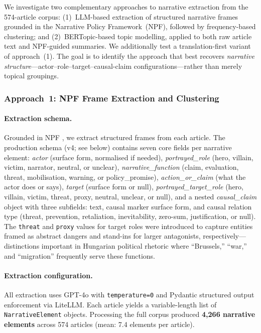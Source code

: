 \documentclass[10pt, a4paper]{article}
\begin{document}
We investigate two complementary approaches to narrative extraction from the 574-article corpus: (1)~LLM-based extraction of structured narrative frames grounded in the Narrative Policy Framework~(NPF), followed by frequency-based clustering; and (2)~BERTopic-based topic modelling, applied to both raw article text and NPF-guided summaries. We additionally test a translation-first variant of approach~(1). The goal is to identify the approach that best recovers \emph{narrative structure}---actor--role--target--causal-claim configurations---rather than merely topical groupings.

\subsubsection{Approach~1: NPF Frame Extraction and Clustering}
\label{sec:npf_extraction}

\paragraph{Extraction schema.}
Grounded in NPF \citep{jones2010narrative, shanahan2018narrative}, we extract structured frames from each article. The production schema (v4; see below) contains seven core fields per narrative element: \textit{actor} (surface form, normalised if needed), \textit{portrayed\_role} (hero, villain, victim, narrator, neutral, or unclear), \textit{narrative\_function} (claim, evaluation, threat, mobilisation, warning, or policy\_promise), \textit{action\_or\_claim} (what the actor does or says), \textit{target} (surface form or null), \textit{portrayed\_target\_role} (hero, villain, victim, threat, proxy, neutral, unclear, or null), and a nested \textit{causal\_claim} object with three subfields: text, causal marker surface form, and causal relation type (threat, prevention, retaliation, inevitability, zero-sum, justification, or null). The \texttt{threat} and \texttt{proxy} values for target roles were introduced to capture entities framed as abstract dangers and stand-ins for larger antagonists, respectively---distinctions important in Hungarian political rhetoric where ``Brussels,'' ``war,'' and ``migration'' frequently serve these functions.

\paragraph{Extraction configuration.}
All extraction uses GPT-4o with \texttt{temperature=0} and Pydantic structured output enforcement via LiteLLM. Each article yields a variable-length list of \texttt{NarrativeElement} objects. Processing the full corpus produced \textbf{4{,}266 narrative elements} across 574 articles (mean: 7.4 elements per article). 
\end{document}
